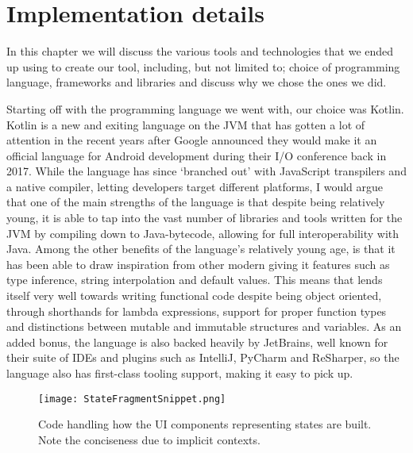 \section{Implementation details}\label{sec:impl}

In this chapter we will discuss the various tools and technologies that we ended up using to create our tool, including, but not limited to; choice of programming language, frameworks and libraries and discuss why we chose the ones we did.

Starting off with the programming language we went with, our choice was Kotlin. Kotlin is a new and exiting language on the JVM that has gotten a lot of attention in the recent years after Google announced they would make it an official language for Android development during their I/O conference back in 2017. While the language has since `branched out' with JavaScript transpilers and a native compiler, letting developers target different platforms, I would argue that one of the main strengths of the language is that despite being relatively young, it is able to tap into the vast number of libraries and tools written for the JVM by compiling down to Java-bytecode, allowing for full interoperability with Java. Among the other benefits of the language's relatively young age, is that it has been able to draw inspiration from other modern giving it features such as type inference, string interpolation and default values. This means that lends itself very well towards writing functional code despite being object oriented, through shorthands for lambda expressions, support for proper function types and distinctions between mutable and immutable structures and variables. As an added bonus, the language is also backed heavily by JetBrains, well known for their suite of IDEs and plugins such as IntelliJ, PyCharm and ReSharper, so the language also has first-class tooling support, making it easy to pick up. 

\begin{figure}[h]
	\texttt{[image: StateFragmentSnippet.png]}
	\caption{Code handling how the UI components representing states are built. Note the conciseness due to implicit contexts.}
	\label{fig:StatFragSnip}
\end{figure}

